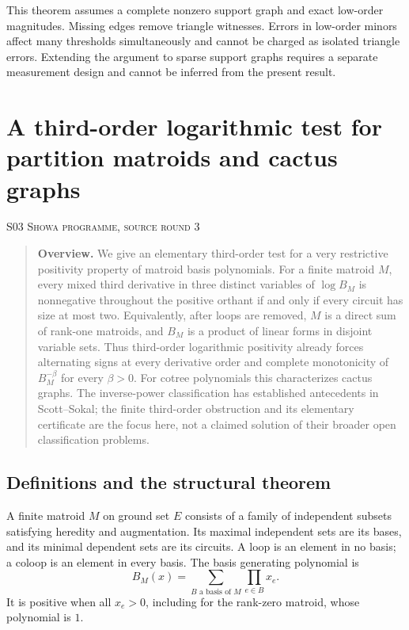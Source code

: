 \documentclass[11pt,a4paper]{article}
\theoremstyle{definition}\newtheorem{definition}[theorem]{Definition}
\theoremstyle{remark}\newtheorem{remark}[theorem]{Remark}
\numberwithin{equation}{section}
\begin{document}
This theorem assumes a complete nonzero support graph and exact low-order magnitudes. Missing edges remove triangle witnesses. Errors in low-order minors affect many thresholds simultaneously and cannot be charged as isolated triangle errors. Extending the argument to sparse support graphs requires a separate measurement design and cannot be inferred from the present result.





\clearpage
\section[S03 --- A third-order logarithmic test for partition matroids and cactus graphs]{A third-order logarithmic test for partition matroids and cactus graphs}\label{contrib-S03}
\noindent\textsc{S03 \quad Showa programme, source round 3}\par\medskip



\begin{quote}\small\textbf{Overview.} We give an elementary third-order test for a very restrictive positivity property of matroid basis polynomials. For a finite matroid $M$, every mixed third derivative in three distinct variables of $\log B_M$ is nonnegative throughout the positive orthant if and only if every circuit has size at most two. Equivalently, after loops are removed, $M$ is a direct sum of rank-one matroids, and $B_M$ is a product of linear forms in disjoint variable sets. Thus third-order logarithmic positivity already forces alternating signs at every derivative order and complete monotonicity of $B_M^{-\beta}$ for every $\beta>0$. For cotree polynomials this characterizes cactus graphs. The inverse-power classification has established antecedents in Scott--Sokal; the finite third-order obstruction and its elementary certificate are the focus here, not a claimed solution of their broader open classification problems.\end{quote}

\subsection{Definitions and the structural theorem}\label{S03-sec-1}
A finite matroid $M$ on ground set $E$ consists of a family of independent subsets satisfying heredity and augmentation. Its maximal independent sets are its bases, and its minimal dependent sets are its circuits. A loop is an element in no basis; a coloop is an element in every basis. The basis generating polynomial is
\[
 B_M(x)=\sum_{B\text{ a basis of }M}\prod_{e\in B}x_e.
\]
It is positive when all $x_e>0$, including for the rank-zero matroid, whose polynomial is $1$.
\end{document}
